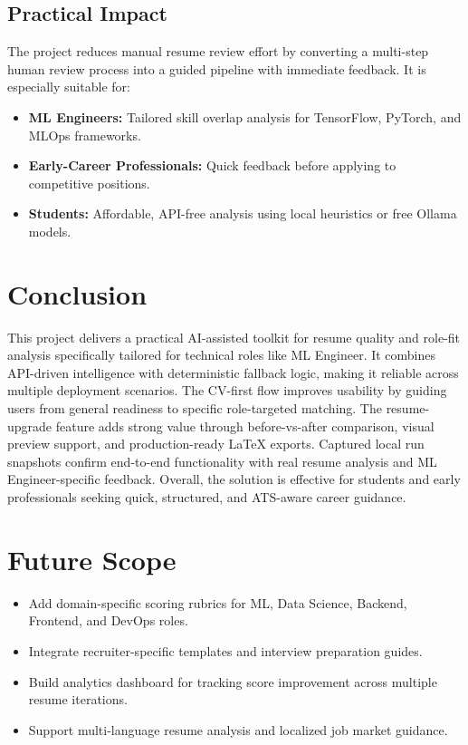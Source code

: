 \documentclass[conference]{IEEEtran}
\begin{document}
\subsection{Practical Impact}
The project reduces manual resume review effort by converting a multi-step human review process into a guided pipeline with immediate feedback. It is especially suitable for:
\begin{itemize}
    \item \textbf{ML Engineers:} Tailored skill overlap analysis for TensorFlow, PyTorch, and MLOps frameworks.
    \item \textbf{Early-Career Professionals:} Quick feedback before applying to competitive positions.
    \item \textbf{Students:} Affordable, API-free analysis using local heuristics or free Ollama models.
\end{itemize}

\section{Conclusion}
This project delivers a practical AI-assisted toolkit for resume quality and role-fit analysis specifically tailored for technical roles like ML Engineer. It combines API-driven intelligence with deterministic fallback logic, making it reliable across multiple deployment scenarios. The CV-first flow improves usability by guiding users from general readiness to specific role-targeted matching. The resume-upgrade feature adds strong value through before-vs-after comparison, visual preview support, and production-ready LaTeX exports. Captured local run snapshots confirm end-to-end functionality with real resume analysis and ML Engineer-specific feedback. Overall, the solution is effective for students and early professionals seeking quick, structured, and ATS-aware career guidance.

\section{Future Scope}
\begin{itemize}
    \item Add domain-specific scoring rubrics for ML, Data Science, Backend, Frontend, and DevOps roles.
    \item Integrate recruiter-specific templates and interview preparation guides.
    \item Build analytics dashboard for tracking score improvement across multiple resume iterations.
    \item Support multi-language resume analysis and localized job market guidance.
\end{itemize}
\end{document}
